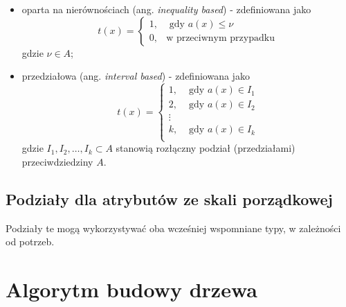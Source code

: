 \documentclass[]{book}
\providecommand{\tightlist}{%
  \setlength{\itemsep}{0pt}\setlength{\parskip}{0pt}}
\theoremstyle{plain}
\theoremstyle{definition}
\begin{document}
\begin{itemize}
\tightlist
\item
  oparta na nierównościach (ang. \emph{inequality based}) - zdefiniowana jako
  \begin{equation}
  t(x) = \begin{cases}
    1, &\text{ gdy }a(x)\leq \nu\\
    0, & \text{w przeciwnym przypadku}
    \end{cases}
  \end{equation}
  gdzie \(\nu\in A\);
\item
  przedziałowa (ang. \emph{interval based}) - zdefiniowana jako
  \begin{equation}
    t(x) = \begin{cases}
        1, &\text{ gdy }a(x) \in I_1\\
        2, &\text{ gdy }a(x) \in I_2\\
        \vdots & \\
        k, &\text{ gdy }a(x) \in I_k\\
    \end{cases}
  \end{equation}
  gdzie \(I_1,I_2,\ldots,I_k\subset A\) stanowią rozłączny podział (przedziałami) przeciwdziedziny \(A\).
\end{itemize}

\hypertarget{podziay-dla-atrybutow-ze-skali-porzadkowej}{%
\subsection{Podziały dla atrybutów ze skali porządkowej}\label{podziay-dla-atrybutow-ze-skali-porzadkowej}}

Podziały te mogą wykorzystywać oba wcześniej wspomniane typy, w zależności od potrzeb.

\hypertarget{algorytm-budowy-drzewa}{%
\section{Algorytm budowy drzewa}\label{algorytm-budowy-drzewa}}
\end{document}
